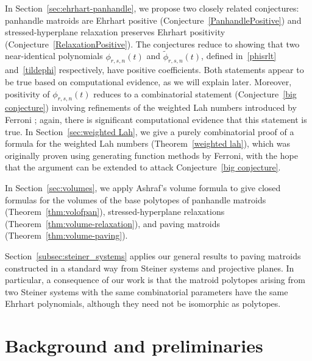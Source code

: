 \documentclass[11pt]{amsart}
\theoremstyle{definition}
\newcommand{\0}{\emptyset}
\DeclareMathOperator{\Pan}{\mathsf{Pan}} %
\begin{document}
In Section~\ref{sec:ehrhart-panhandle}, we propose two closely related conjectures: panhandle matroids are Ehrhart positive (Conjecture~\ref{PanhandlePositive}) and stressed-hyperplane relaxation preserves Ehrhart positivity (Conjecture~\ref{RelaxationPositive}).
The conjectures reduce to showing that two near-identical polynomials $\phi_{r,s,n}(t)$ and $\tilde{\phi}_{r,s,n}(t)$, defined in~\eqref{phisrlt} and~\eqref{tildephi} respectively, have positive coefficients. 
Both statements appear to be true based on computational evidence, as we will explain later.
Moreover, positivity of $\phi_{r,s,n}(t)$ reduces to a combinatorial statement (Conjecture~\ref{big conjecture}) involving refinements of the weighted Lah numbers introduced by Ferroni \cite{FerroniHypersimplices}; again, there is significant computational evidence that this statement is true.
In Section~\ref{sec:weighted Lah}, we give a purely combinatorial proof of a formula for the weighted Lah numbers (Theorem~\ref{weighted lah}), which was originally proven using generating function methods by Ferroni, with the hope that the argument can be extended to attack Conjecture~\ref{big conjecture}. 



In Section~\ref{sec:volumes}, we apply Ashraf's volume formula to give closed formulas for the volumes of the base polytopes of panhandle matroids (Theorem~\ref{thm:volofpan}), stressed-hyperplane relaxations (Theorem~\ref{thm:volume-relaxation}), and paving matroids (Theorem~\ref{thm:volume-paving}).

Section~\ref{subsec:steiner_systems} applies our general results to paving matroids constructed in a standard way from Steiner systems and projective planes.
In particular, a consequence of our work is that the matroid polytopes arising from two Steiner systems with the same combinatorial parameters have the same Ehrhart polynomials, although they need not be isomorphic as polytopes.


\section{Background and preliminaries}\label{sec:prelims}
\end{document}

